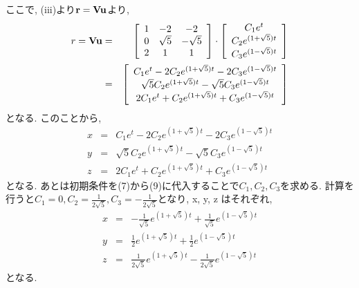 \documentclass[10pt]{jarticle}
\begin{document}
ここで, (iii)より${\bf{r}} = {\bf{Vu}}$より, 
\begin{eqnarray}
	{{\bf}r} = {\bf{Vu}} &=& 
	\left[
		\begin{array}{ccc}
			1 & -2 & -2 \\
			0 & \sqrt{5} & -\sqrt{5} \\
			2 & 1 & 1 \\
		\end{array}
	\right]
	\cdot
	\left[
		\begin{array}{c}
			C_1e^t \\
			C_2e^{(1 + \sqrt{5})t} \\
			C_3e^{(1 - \sqrt{5})t} \\
		\end{array}
	\right]\\
	&=&
	\left[
		\begin{array}{c}
			C_1e^t - 2C_2e^{(1 + \sqrt{5})t} - 2C_3e^{(1 - \sqrt{5})t} \\
			\sqrt{5}C_2e^{(1 + \sqrt{5})t} - \sqrt{5}C_3e^{(1 - \sqrt{5})t} \\
			2C_1e^t + C_2e^{(1 + \sqrt{5})t} + C_3e^{(1 - \sqrt{5})t}\\
		\end{array}
	\right]
\end{eqnarray}
となる. このことから, 
\begin{eqnarray}
	x &=& C_1e^t - 2C_2e^{(1 + \sqrt{5})t} - 2C_3e^{(1 - \sqrt{5})t} \\
	y &=& \sqrt{5}C_2e^{(1 + \sqrt{5})t} - \sqrt{5}C_3e^{(1 - \sqrt{5})t} \\
	z &=& 2C_1e^t + C_2e^{(1 + \sqrt{5})t} + C_3e^{(1 - \sqrt{5})t}
\end{eqnarray}
となる. あとは初期条件を(7)から(9)に代入することで$C_1, C_2, C_3$を求める. 
計算を行うと$C_1 = 0, C_2 = \frac{1}{2\sqrt{5}}, C_3 = -\frac{1}{2\sqrt{5}}$となり, x, y, z はそれぞれ, 
\begin{eqnarray}
	x &=& -\frac{1}{\sqrt{5}}e^{(1 + \sqrt{5})t} + \frac{1}{\sqrt{5}}e^{(1 - \sqrt{5})t} \\
	y &=& \frac{1}{2}e^{(1 + \sqrt{5})t} + \frac{1}{2}e^{(1 - \sqrt{5})t} \\
	z &=& \frac{1}{2\sqrt{5}}e^{(1 + \sqrt{5})t} - \frac{1}{2\sqrt{5}}e^{(1 - \sqrt{5})t}
\end{eqnarray}
となる.
\end{document}
